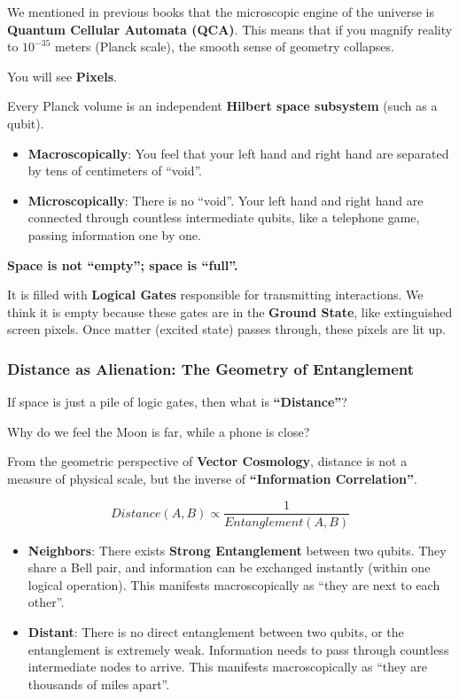 We mentioned in previous books that the microscopic engine of the universe is \textbf{Quantum Cellular Automata (QCA)}. This means that if you magnify reality to $10^{-35}$ meters (Planck scale), the smooth sense of geometry collapses.

You will see \textbf{Pixels}.

Every Planck volume is an independent \textbf{Hilbert space subsystem} (such as a qubit).

\begin{itemize}
\item \textbf{Macroscopically}: You feel that your left hand and right hand are separated by tens of centimeters of ``void''.

\item \textbf{Microscopically}: There is no ``void''. Your left hand and right hand are connected through countless intermediate qubits, like a telephone game, passing information one by one.
\end{itemize}

\textbf{Space is not ``empty''; space is ``full''.}

It is filled with \textbf{Logical Gates} responsible for transmitting interactions. We think it is empty because these gates are in the \textbf{Ground State}, like extinguished screen pixels. Once matter (excited state) passes through, these pixels are lit up.

\subsubsection{Distance as Alienation: The Geometry of Entanglement}

If space is just a pile of logic gates, then what is \textbf{``Distance''}?

Why do we feel the Moon is far, while a phone is close?

From the geometric perspective of \textbf{Vector Cosmology}, distance is not a measure of physical scale, but the inverse of \textbf{``Information Correlation''}.

\[Distance(A, B) \propto \frac{1}{Entanglement(A, B)}\]

\begin{itemize}
\item \textbf{Neighbors}: There exists \textbf{Strong Entanglement} between two qubits. They share a Bell pair, and information can be exchanged instantly (within one logical operation). This manifests macroscopically as ``they are next to each other''.

\item \textbf{Distant}: There is no direct entanglement between two qubits, or the entanglement is extremely weak. Information needs to pass through countless intermediate nodes to arrive. This manifests macroscopically as ``they are thousands of miles apart''.
\end{itemize}

